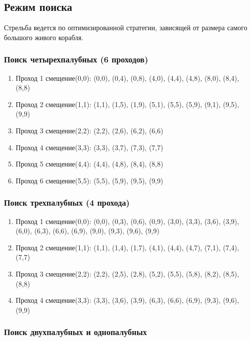 \documentclass[oneside,a4paper,14pt]{extarticle}
\begin{document}
\subsection*{Режим поиска}

Стрельба ведется по оптимизированной стратегии, зависящей от размера самого большого живого корабля.

\subsubsection*{Поиск четырехпалубных (6 проходов)}

\begin{enumerate}
  \item Проход 1 смещение(0,0): (0,0), (0,4), (0,8), (4,0), (4,4), (4,8), (8,0), (8,4), (8,8)
  \item Проход 2 смещение(1,1): (1,1), (1,5), (1,9), (5,1), (5,5), (5,9), (9,1), (9,5), (9,9)
  \item Проход 3 смещение(2,2): (2,2), (2,6), (6,2), (6,6)
  \item Проход 4 смещение(3,3): (3,3), (3,7), (7,3), (7,7)
  \item Проход 5 смещение(4,4): (4,4), (4,8), (8,4), (8,8)
  \item Проход 6 смещение(5,5): (5,5), (5,9), (9,5), (9,9)
\end{enumerate}

\subsubsection*{Поиск трехпалубных (4 прохода)}

\begin{enumerate}
  \item Проход 1 смещение(0,0): (0,0), (0,3), (0,6), (0,9), (3,0), (3,3), (3,6), (3,9), (6,0), (6,3), (6,6), (6,9), (9,0), (9,3), (9,6), (9,9)
  \item Проход 2 смещение(1,1): (1,1), (1,4), (1,7), (4,1), (4,4), (4,7), (7,1), (7,4), (7,7)
  \item Проход 3 смещение(2,2): (2,2), (2,5), (2,8), (5,2), (5,5), (5,8), (8,2), (8,5), (8,8)
  \item Проход 4 смещение(3,3): (3,3), (3,6), (3,9), (6,3), (6,6), (6,9), (9,3), (9,6), (9,9)
\end{enumerate}

\subsubsection*{Поиск двухпалубных и однопалубных}
\end{document}
